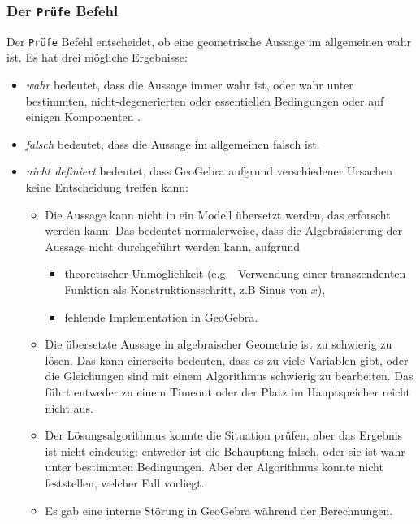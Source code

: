 \documentclass{article}
\begin{document}
\subsubsection{Der \texttt{Prüfe} Befehl}
Der \texttt{Prüfe} Befehl entscheidet, ob eine geometrische Aussage im allgemeinen wahr ist. Es hat drei mögliche Ergebnisse:
\begin{itemize}
    \item \textit{wahr} bedeutet, dass die Aussage immer wahr ist, oder wahr unter bestimmten, nicht-degenerierten \cite{Chou} oder essentiellen \cite{KovacsRecioSolyomGecse} Bedingungen oder auf einigen Komponenten \cite{ZhouWangSun}.
    \item \textit{falsch} bedeutet, dass die Aussage im allgemeinen falsch ist.
    \item \textit{nicht definiert} bedeutet, dass GeoGebra aufgrund verschiedener Ursachen keine Entscheidung treffen kann:
    \begin{itemize}
        \item Die Aussage kann nicht in ein Modell übersetzt werden, das erforscht werden kann. Das bedeutet normalerweise, dass die Algebraisierung der Aussage nicht durchgeführt werden kann, aufgrund
        \begin{itemize}
            \item theoretischer Unmöglichkeit (e.g.~ Verwendung einer transzendenten Funktion als Konstruktionsschritt, z.B Sinus von $x$),
            \item fehlende Implementation in GeoGebra.
        \end{itemize}
        \item Die übersetzte Aussage in algebraischer Geometrie ist zu schwierig zu lösen. Das kann einerseits bedeuten, dass es zu viele Variablen gibt, oder die Gleichungen sind mit einem Algorithmus schwierig zu bearbeiten. Das führt entweder zu einem Timeout oder der Platz im Hauptspeicher reicht nicht aus.
        \item Der Lösungsalgorithmus konnte die Situation prüfen, aber das Ergebnis ist nicht eindeutig: entweder ist die Behauptung falsch, oder sie ist wahr unter bestimmten Bedingungen. Aber der Algorithmus konnte nicht feststellen, welcher Fall vorliegt.
        \item Es gab eine interne Störung in GeoGebra während der Berechnungen.
    \end{itemize}
\end{itemize}

\vfill\eject %
\end{document}
